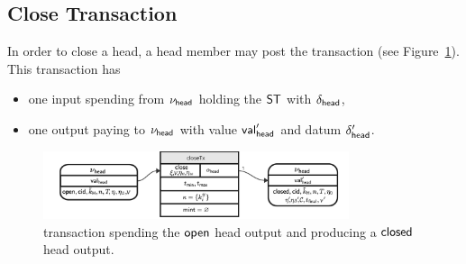 \subsection{Close Transaction}\label{sec:close-tx}

In order to close a head, a head member may post the \mtxClose{} transaction
(see Figure~\ref{fig:closeTx}). This transaction has
\begin{itemize}
	\item one input spending from $\nu_\mathsf{head}$ holding the $\mathsf{ST}$ with $\delta_{\mathsf{head}}$,
	\item one output paying to $\nu_\mathsf{head}$ with value $\mathsf{val}_{\mathsf{head}}'$ and
	      datum $\delta_{\mathsf{head}}'$.
\end{itemize}

\begin{figure}
	\centering
	\includegraphics[width=0.8\textwidth]{figures/closeTx.pdf}
	\caption{\mtxClose{} transaction spending the $\mathsf{open}$ head output and producing a $\mathsf{closed}$ head output.}\label{fig:closeTx}
\end{figure}

